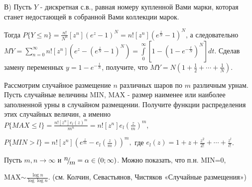 \begin{ordre}
В) Пусть $Y$ - дискретная с.в., равная номеру купленной Вами 
марки, которая станет недостающей в собранной Вами коллекции марок.

Тогда $P\{Y\le n\}=\frac{n!}{N^n}\left[ {z^n} \right](e^z-1)^N=n!\left[ 
{z^n} \right](e^{\frac{z}{N}}-1)^N$, а следовательно 
$MY=\sum\limits_{n=0}^\infty {n!\left[ {z^n} \right]\left( 
{e^z-(e^{\frac{z}{N}}-1)^N} \right)} =\int\limits_0^\infty {\left[ 
{1-(1-e^{-\frac{t}{N}})^N} \right]} dt$. Сделав замену переменных 
$y=1-e^{-\frac{t}{N}}$, получите, что $MY=N\left( {1+\frac{1}{2}+\cdots 
+\frac{1}{N}} \right)$.

\end{ordre}

\begin{problem}

Рассмотрим случайное размещение $n$ различных шаров по $m$ различным урнам. 
Пусть случайные величины MIN, MAX - размер наименее или наиболее заполненной 
урны в случайном размещении. Получите функции распределения этих случайных 
величин, а именно $P\{MAX\le l\}=\frac{n!\left[ {z^n} \right]e_l 
(z)^m}{m^n}=n!\left[ {z^n} \right]e_l \left( {\frac{z}{m}} \right)^m$,

$P\{MIN>l\}=n!\left[ {z^n} \right]\left( {e^{\frac{z}{m}}-e_l \left( 
{\frac{z}{m}} \right)} \right)^m,$ где $e_l (z)=1+z+\frac{z^2}{2!}+\cdots 
+\frac{z^l}{l!}$.

\end{problem}

\begin{remark}

  Пусть $m,n\to \infty $ и ${\raise0.7ex\hbox{$ n $}\!\mathord{\left/ {\vphantom {n m}} \right. \kern-\nulldelimiterspace}\!\lower0.7ex\hbox{$ m $}} =\alpha \in \left(0;\infty \right)$. Можно показать, что п.н. MIN=0, 

\noindent MAX$\sim \frac{\log n}{\log \log n} $. (см. Колчин, Севастьянов, Чистяков «Случайные размещения»)

\end{remark}

